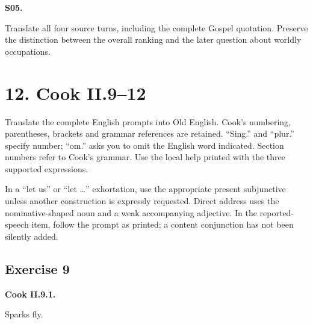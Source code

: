 \par\begin{minipage}{\linewidth}\raggedright
\textbf{S05.}

Translate all four source turns, including the complete Gospel quotation. Preserve the distinction between the overall ranking and the later question about worldly occupations.

\end{minipage}\par\addvspace{4pt}

\section*{12. Cook II.9–12}

Translate the complete English prompts into Old English. Cook’s numbering, parentheses, brackets and grammar references are retained. “Sing.” and “plur.” specify number; “om.” asks you to omit the English word indicated. Section numbers refer to Cook’s grammar. Use the local help printed with the three supported expressions.

In a “let us” or “let …” exhortation, use the appropriate present subjunctive unless another construction is expressly requested. Direct address uses the nominative-shaped noun and a weak accompanying adjective. In the reported-speech item, follow the prompt as printed; a content conjunction has not been silently added.

\subsection*{Exercise 9}

\par\begin{minipage}{\linewidth}\raggedright
\textbf{Cook II.9.1.}

Sparks fly.

\end{minipage}\par\addvspace{4pt}

